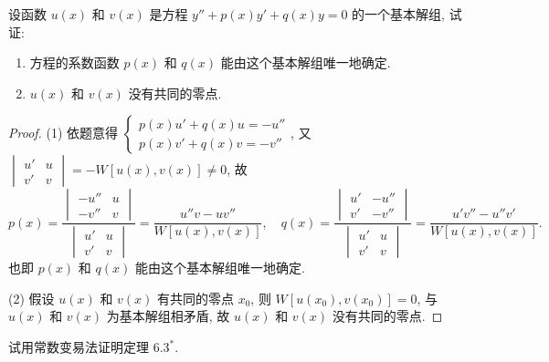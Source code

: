 \begin{exercise}
  设函数 $u(x)$ 和 $v(x)$ 是方程 $y''+p(x)y'+q(x)y=0$ 的一个基本解组, 试证:
  \begin{enumerate}[(1)]
  \item 方程的系数函数 $p(x)$ 和 $q(x)$ 能由这个基本解组唯一地确定.
  \item $u(x)$ 和 $v(x)$ 没有共同的零点.
  \end{enumerate}
\end{exercise}

\begin{proof}
  (1) 依题意得 $\begin{cases}p(x)u'+q(x)u=-u''\\p(x)v'+q(x)v=-v''\end{cases}$, 
  又 $\begin{vmatrix}u'&u\\v'&v\end{vmatrix}=-W[u(x),v(x)]\neq 0$, 故
  \[p(x) 
    = \frac{\begin{vmatrix}-u''&u\\-v''&v\end{vmatrix}}{\begin{vmatrix}u'&u\\v'&v\end{vmatrix}}
    = \frac{u''v-uv''}{W[u(x),v(x)]},\quad
    q(x)
    = \frac{\begin{vmatrix}u'&-u''\\v'&-v''\end{vmatrix}}{\begin{vmatrix}u'&u\\v'&v\end{vmatrix}}
    = \frac{u'v''-u''v'}{W[u(x),v(x)]}.\]
  也即 $p(x)$ 和 $q(x)$ 能由这个基本解组唯一地确定.

  (2) 假设 $u(x)$ 和 $v(x)$ 有共同的零点 $x_0$, 则 $W[u(x_0),v(x_0)]=0$, 
  与 $u(x)$ 和 $v(x)$ 为基本解组相矛盾, 故 $u(x)$ 和 $v(x)$ 没有共同的零点.
\end{proof}



\begin{exercise}
  试用常数变易法证明定理 $6.3^*$.
\end{exercise}

